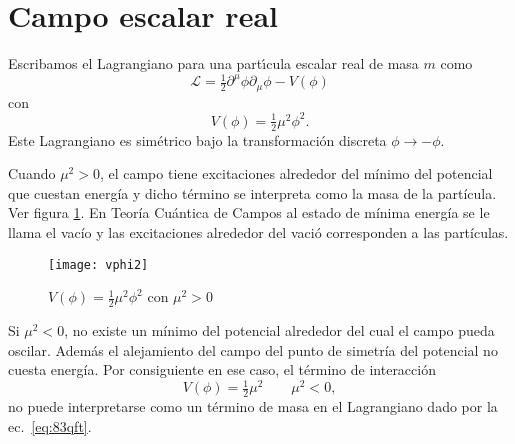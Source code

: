  



\section{Campo escalar real}

\begin{frame}
Escribamos el Lagrangiano para una part\'\i cula escalar real de masa $m$ como
\begin{equation}
\label{eq:83qft}
\mathcal{L}=\tfrac{1}{2}\partial^\mu\phi\partial_\mu\phi-V(\phi)
\end{equation}
con
\begin{equation}
  V(\phi)=\tfrac{1}{2}\mu^2\phi^2.
\end{equation}
Este Lagrangiano es simétrico bajo la transformación discreta $\phi\to-\phi$. 

Cuando $\mu^2\gt 0$, el campo tiene excitaciones alrededor del mínimo del potencial que cuestan energía y dicho término se interpreta como la masa de la partícula. Ver figura \ref{fig:x2}. En Teoría Cuántica de Campos al estado de mínima energía se le llama el vacío y las excitaciones alrededor del vació corresponden a las partículas.
\begin{figure} %
  \centering %
  \texttt{[image: vphi2]}
  \caption{$V(\phi)=\frac{1}{2}\mu^2 \phi^2$ con $\mu^2\gt 0$} %
  \label{fig:x2} %
\end{figure} %
\end{frame}
Si $\mu^2\lt 0$, no existe un mínimo del potencial alrededor del cual el campo pueda oscilar. Además el alejamiento del campo del punto de simetría del potencial no cuesta energía. Por consiguiente en ese caso, el término de interacción
\begin{equation}
  V(\phi)=\tfrac{1}{2}\mu^2   \qquad 
  \mu^2\lt 0,
\end{equation}
no puede interpretarse como un término de masa en el Lagrangiano dado por la ec.~\eqref{eq:83qft}. 

